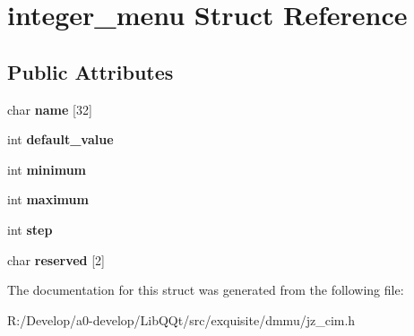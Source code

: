 \hypertarget{structinteger__menu}{}\section{integer\+\_\+menu Struct Reference}
\label{structinteger__menu}
\subsection*{Public Attributes}
\begin{DoxyCompactItemize}
\item 
\mbox{\label{structinteger__menu_a7552d0f24f2da036d23a587e8d249265}} 
char {\bfseries name} \mbox{[}32\mbox{]}
\item 
\mbox{\label{structinteger__menu_a9a5bc044a3b185243fe92c41dbb68b9a}} 
int {\bfseries default\+\_\+value}
\item 
\mbox{\label{structinteger__menu_a791287f70ac1cf427e68732bc4663b72}} 
int {\bfseries minimum}
\item 
\mbox{\label{structinteger__menu_a9295b827bf969e4f654bfe6d08bc6151}} 
int {\bfseries maximum}
\item 
\mbox{\label{structinteger__menu_a83293ec582e585e1d3d669f50933ed34}} 
int {\bfseries step}
\item 
\mbox{\label{structinteger__menu_a1f10d6b236271d46a25448496b7fb097}} 
char {\bfseries reserved} \mbox{[}2\mbox{]}
\end{DoxyCompactItemize}


The documentation for this struct was generated from the following file\+:\begin{DoxyCompactItemize}
\item 
R\+:/\+Develop/a0-\/develop/\+Lib\+Q\+Qt/src/exquisite/dmmu/jz\+\_\+cim.\+h\end{DoxyCompactItemize}
